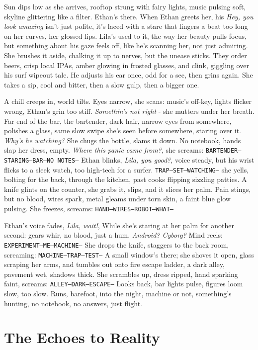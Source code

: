 \documentclass[12pt,oneside]{book} %
\newcommand{\note}[1]{\texttt{#1}}
\begin{document}
Sun dips low as she arrives, rooftop strung with fairy lights, music pulsing soft, skyline glittering like a filter. Ethan’s there. When Ethan greets her, his \textit{Hey, you look amazing} isn’t just polite, it’s laced with a stare that lingers a beat too long on her curves, her glossed lips. Lila’s used to it, the way her beauty pulls focus, but something about his gaze feels off, like he’s scanning her, not just admiring. She brushes it aside, chalking it up to nerves, but the unease sticks. They order beers, crisp local IPAs, amber glowing in frosted glasses, and clink, giggling over his surf wipeout tale. He adjusts his ear once, odd for a sec, then grins again. She takes a sip, cool and bitter, then a slow gulp, then a bigger one.

A chill creeps in, world tilts. Eyes narrow, she scans: music’s off-key, lights flicker wrong, Ethan’s grin too stiff. \textit{Somethin’s not right} - she mutters under her breath. Far end of the bar, the bartender, dark hair, narrow eyes from somewhere, polishes a glass, same slow swipe she’s seen before somewhere, staring over it. \textit{Why’s he watching?} She chugs the bottle, slams it down. No notebook, hands slap her dress, empty. \textit{Where this panic came from?}, she screams: \note{BARTENDER—STARING—BAR—NO NOTES—} Ethan blinks, \textit{Lila, you good?}, voice steady, but his wrist flicks to a sleek watch, too high-tech for a surfer. \note{TRAP—SET—WATCHING—} she yells, bolting for the back, through the kitchen, past cooks flipping sizzling patties. A knife glints on the counter, she grabs it, slips, and it slices her palm. Pain stings, but no blood, wires spark, metal gleams under torn skin, a faint blue glow pulsing. She freezes, screams: \note{HAND—WIRES—ROBOT—WHAT—}

Ethan’s voice fades, \textit{Lila, wait!}, While she’s staring at her palm for another second: gears whir, no blood, just a hum. \textit{Android? Cyborg?} Mind reels: \note{EXPERIMENT—ME—MACHINE—} She drops the knife, staggers to the back room, screaming: \note{MACHINE—TRAP—TEST—} A small window’s there; she shoves it open, glass scraping her arms, and tumbles out onto fire escape ladder, a dark alley, pavement wet, shadows thick. She scrambles up, dress ripped, hand sparking faint, screams: \note{ALLEY—DARK—ESCAPE—} Looks back, bar lights pulse, figures loom slow, too slow. Runs, barefoot, into the night, machine or not, something’s hunting, no notebook, no answers, just flight.

\part{The Echoes to Reality}
\end{document}
